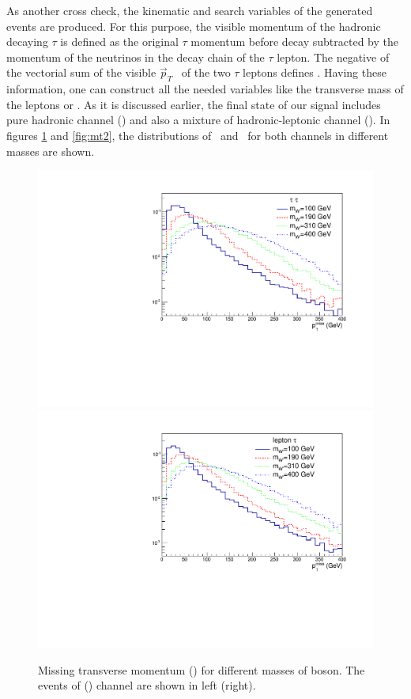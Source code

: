 As another cross check, the kinematic  and search  variables of the generated events are produced. 
For this purpose, the visible momentum of the hadronic decaying $\tau$ is defined as the original $\tau$ momentum before decay subtracted by the momentum of the neutrinos in the decay chain of the $\tau$ lepton. The negative of the vectorial sum of the visible $\vec{p}_T$ ~of the two $\tau$ leptons defines \MET. Having these information, one can construct all the needed variables like the transverse mass of the leptons or \mttwo. 
As it is discussed earlier, the final state of our signal includes pure hadronic channel (\tauTau) and also a mixture of hadronic-leptonic channel (\lepTau ).  In figures \ref{fig:met} and \ref{fig:mt2}, the distributions of \MET ~and \mttwo ~for both channels in different \wprime masses are shown.
\begin{figure}[htb]
	\centering
	\includegraphics*[width=.45\textwidth]{figs/MET_hh.pdf}
	\hspace{3mm}
	\includegraphics*[width=.45\textwidth]{figs/MET_lh.pdf}
	\caption{Missing transverse momentum (\MET) for different masses of \wprime boson. The events of \tauTau(\lepTau) channel are shown in left (right).}
	\label{fig:met}
\end{figure}
